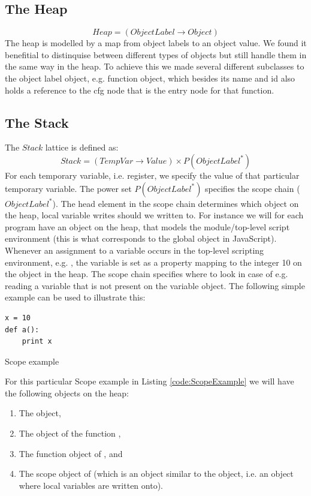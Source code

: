 \subsection{The Heap}
\begin{equation*}
Heap = (ObjectLabel \rightarrow Object)
\end{equation*}
The heap is modelled by a map from object labels to an object value. We found it benefitial to distinquise between different types of objects but still handle them in the same way in the heap.
To achieve this we made several different subclasses to the object label object, e.g. function object, which besides its name and id also holds a reference to the cfg node that is the entry node for that function.


\subsection{The Stack}
The $Stack$ lattice is defined as:
\begin{equation*}
Stack = (TempVar \rightarrow Value) \times P(ObjectLabel^{*})
\end{equation*}
For each temporary variable, i.e. register, we specify the value of that particular temporary variable. The power set $P(ObjectLabel^{*})$ specifies the scope chain ($ObjectLabel^{*}$). The head element in the scope chain determines which object on the heap, local variable writes should we written to. For instance we will for each program have an object on the heap, that models the module/top-level script environment \cite{pyref.main} (this is what corresponds to the global object in JavaScript). Whenever an assignment to a variable occurs in the top-level scripting environment, e.g. , the variable  is set as a property mapping to the integer 10 on the  object in the heap.
The scope chain specifies where to look in case of e.g. reading a variable that is not present on the variable object. The following simple example can be used to illustrate this:
\begin{listing}[H]
	\begin{verbatim}
x = 10 
def a():
	print x
	\end{verbatim}
\caption{Scope example}\label{code:ScopeExample}
\end{listing}
For this particular Scope example in Listing \ref{code:ScopeExample} we will have the following objects on the heap:
\begin{enumerate}
  \item The  object,
  \item The object of the function ,
  \item The function object of , and
  \item The scope object of  (which is an object similar to the  object, i.e. an object where local variables are written onto).
\end{enumerate}
